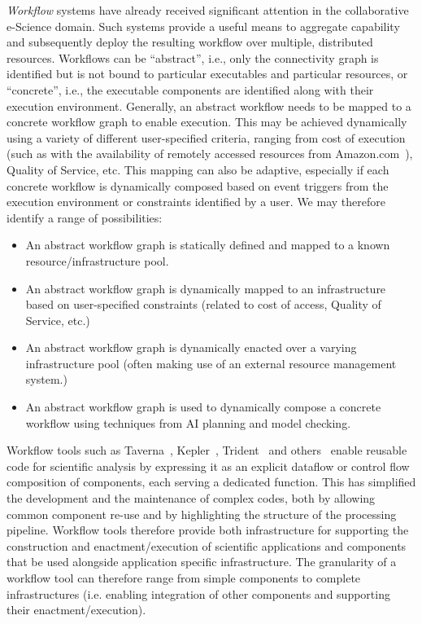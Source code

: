 




{\em Workflow} systems have already received significant attention in
the collaborative e-Science domain.  Such systems provide a useful
means to aggregate capability and subsequently deploy the resulting
workflow over multiple, distributed resources. Workflows can be
``abstract'', i.e., only the connectivity graph is identified but is
not bound to particular executables and particular resources, or
``concrete'', i.e., the executable components are identified along
with their execution environment. Generally, an abstract workflow
needs to be mapped to a concrete workflow graph to enable
execution. This may be achieved dynamically using a variety of
different user-specified criteria, ranging from cost of execution
(such as with the availability of remotely accessed resources from
Amazon.com~\cite{berriman11}), Quality of Service, etc. This mapping
can also be adaptive, especially if each concrete workflow is
dynamically composed based on event triggers from the execution
environment or constraints identified by a user. We may therefore
identify a range of possibilities:

\begin{itemize}

\item An abstract workflow graph is statically defined and mapped to a known resource/infrastructure pool.

\item An abstract workflow graph is dynamically mapped to an infrastructure based on user-specified constraints (related to cost of access, Quality of Service, etc.)

\item An abstract workflow graph is dynamically enacted over a varying infrastructure pool (often making use of an external resource management system.)

\item An abstract workflow graph is used to dynamically compose a concrete workflow using techniques from AI planning and model checking.

\end{itemize}

Workflow tools such as Taverna~\cite{Taverna}, Kepler~\cite{Kepler},
Trident~\cite{Trident} and others~\cite{iantaylorsbook}  enable reusable code for scientific analysis by
expressing it as an explicit dataflow or control flow composition of
components, each serving a dedicated function. This has simplified the
development and the maintenance of complex codes, both by allowing
common component re-use and by highlighting the structure of the
processing pipeline. Workflow tools therefore provide both
infrastructure for supporting the construction and enactment/execution
of scientific applications and components that be used alongside
application specific infrastructure. The granularity of a workflow
tool can therefore range from simple components to complete
infrastructures (i.e. enabling integration of other components and
supporting their enactment/execution).

